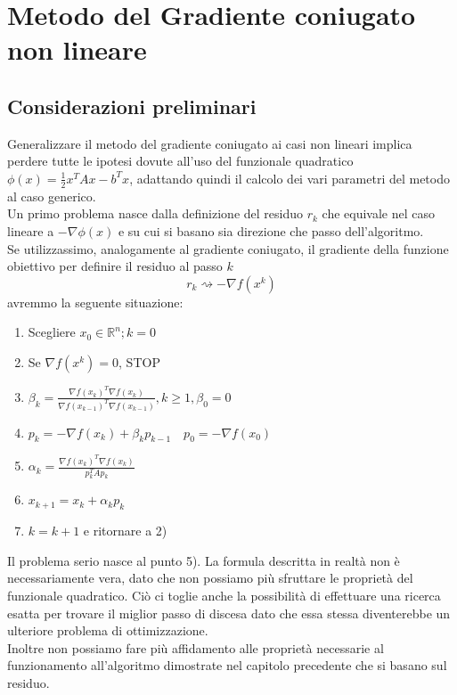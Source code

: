 \chapter{Metodo del Gradiente coniugato non lineare}

\section{Considerazioni preliminari} Generalizzare il metodo del
gradiente coniugato ai casi non lineari implica perdere tutte le
ipotesi dovute all'uso del funzionale quadratico $\phi(x) =
\frac{1}{2} x^{T} A x - b^{T} x$, adattando quindi il calcolo dei vari
parametri del metodo al caso generico.\\

Un primo problema nasce dalla definizione del residuo $r_{k}$ che
equivale nel caso lineare a $-\nabla \phi(x)$ e su cui si basano sia
direzione che passo dell'algoritmo. \\

Se utilizzassimo, analogamente al gradiente coniugato, il gradiente
della funzione obiettivo per definire il residuo al passo $k$
 $$ r_{k}\rightsquigarrow -\nabla f(x^{k})$$
avremmo la seguente situazione:

\begin{enumerate}
 \item Scegliere $x_0 \in \mathbb{R}^{n}; k =0$
 \item Se $\nabla f(x^{k}) = 0$, STOP
 \item $\beta_{k} = \frac{\nabla f(x_{k})^{T} \nabla f(x_{k})} {\nabla
f(x_{k-1})^{T} \nabla f(x_{k-1})}, k \geq 1, \beta_{0} = 0$
 \item $p_{k} = -\nabla f(x_{k}) + \beta_{k} p_{k-1} \quad p_{0} =
-\nabla f(x_{0})$
 \item $\alpha_{k} = \frac{\nabla f(x_{k})^{T} \nabla f(x_{k})}{p_{k}^{T}Ap_{k}}$ \\
 \item $x_{k+1} = x_{k} +\alpha_{k} p_{k}$
 \item $k = k+1$ e ritornare a 2)
\end{enumerate} Il problema serio nasce al punto 5). La formula
descritta in realtà non \`e necessariamente vera, dato che non possiamo
più sfruttare le proprietà del funzionale quadratico. Ciò ci toglie
anche la possibilità di effettuare una ricerca esatta per trovare il
miglior passo di discesa dato che essa stessa diventerebbe un
ulteriore problema di ottimizzazione.\\ Inoltre non possiamo fare più
affidamento alle proprietà necessarie al funzionamento all'algoritmo
dimostrate nel capitolo precedente che si basano sul residuo. \\


